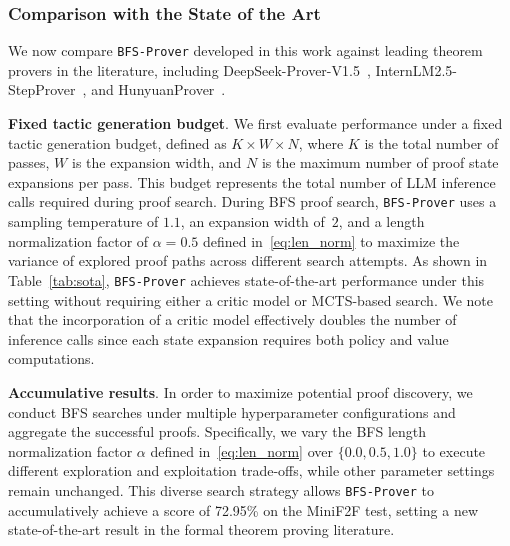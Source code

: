 \documentclass[10pt,english]{article}
\begin{document}
\subsubsection{Comparison with the State of the Art}
We now compare \texttt{BFS-Prover} developed in this work against leading theorem provers in the literature, including DeepSeek-Prover-V1.5~\citep{deepseek-proer-v1.5}, InternLM2.5-StepProver~\citep{intern-prover-v2.5}, and HunyuanProver~\citep{hunyuanprover}.

\textbf{Fixed tactic generation budget}. We first evaluate performance under a fixed tactic generation budget, defined as $K \times W \times N$, where $K$ is the total number of passes, $W$ is the expansion width, and $N$ is the maximum number of proof state expansions per pass.  This budget represents the total number of LLM inference calls required during proof search.
During BFS proof search, \texttt{BFS-Prover} uses a sampling temperature of $1.1$, an expansion width of~$2$, and a length normalization factor of $\alpha=0.5$ defined in~\eqref{eq:len_norm} to maximize the variance of explored proof paths across different search attempts. As shown in Table~\ref{tab:sota}, \texttt{BFS-Prover} achieves state-of-the-art performance under this setting without requiring either a critic model or MCTS-based search. We note that the incorporation of a critic model effectively doubles the number of inference calls since each state expansion requires both policy and value computations.

\textbf{Accumulative results}. In order to maximize potential proof discovery, we conduct BFS searches under multiple hyperparameter configurations and aggregate the successful proofs. Specifically, we vary the BFS length normalization factor $\alpha$ defined in~\eqref{eq:len_norm} over $\{0.0, 0.5, 1.0\}$ to execute different exploration and exploitation trade-offs, while other parameter settings remain unchanged. This diverse search strategy allows \texttt{BFS-Prover} to accumulatively achieve a score of 72.95\% on the MiniF2F test, setting a new state-of-the-art result in the formal theorem proving literature.
\end{document}
